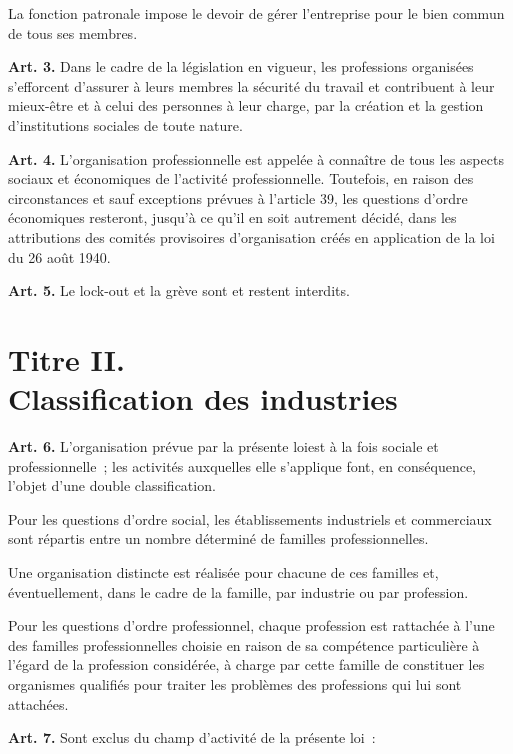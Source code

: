 \documentclass[french,twoside]{book} %
\newcommand{\labelchar}[1]{\textbf{\color{rubric} #1}}
\def\mednobreak{\ifdim\lastskip<\medskipamount
  \removelastskip\nopagebreak\medskip\fi}
\newcommand{\labelblock}[1]{\medbreak{\noindent\color{rubric}\bfseries #1}\par\mednobreak}
\begin{document}
La fonction patronale impose le devoir de gérer l’entreprise pour le bien commun de tous ses membres.\par
\bigbreak
\noindent \labelchar{Art. 3.} Dans le cadre de la législation en vigueur, les professions organisées s’efforcent d’assurer à leurs membres la sécurité du travail et contribuent à leur mieux-être et à celui des personnes à leur charge, par la création et la gestion d’institutions sociales de toute nature.\par
\bigbreak
\noindent \labelchar{Art. 4.} L’organisation professionnelle est appelée à connaître de tous les aspects sociaux et économiques de l’activité professionnelle. Toutefois, en raison des circonstances et sauf exceptions prévues à l’article 39, les questions d’ordre économiques resteront, jusqu’à ce qu’il en soit autrement décidé, dans les attributions des comités provisoires d’organisation créés en application de la loi du 26 août 1940.\par
\bigbreak
\noindent \labelchar{Art. 5.} Le lock-out et la grève sont et restent interdits.
\section[{Titre II. Classification des industries}]{Titre II. \\
Classification des industries}\renewcommand{\leftmark}{Titre II. \\
Classification des industries}


\labelblock{Commerces et professions}

\noindent \labelchar{Art. 6.} L’organisation prévue par la présente loiest à la fois sociale et professionnelle ; les activités auxquelles elle s’applique font, en conséquence, l’objet d’une double classification.\par
Pour les questions d’ordre social, les établissements industriels et commerciaux sont répartis entre un nombre déterminé de familles professionnelles.\par
Une organisation distincte est réalisée pour chacune de ces familles et, éventuellement, dans le cadre de la famille, par industrie ou par profession.\par
Pour les questions d’ordre professionnel, chaque profession est rattachée à l’une des familles professionnelles choisie en raison de sa compétence particulière à l’égard de la profession considérée, à charge par cette famille de constituer les organismes qualifiés pour traiter les problèmes des professions qui lui sont attachées.\par
\bigbreak
\noindent \labelchar{Art. 7.} Sont exclus du champ d’activité de la présente loi :\par
\end{document}
